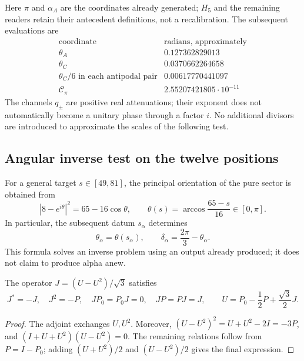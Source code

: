 Here \(\pi\) and \(\alpha_A\) are the coordinates already generated; \(H_5\) and the remaining readers retain their antecedent definitions, not a recalibration. The subsequent evaluations are
\[
\begin{array}{c|c}
 \text{coordinate}&\text{radians, approximately}\\\hline
 \theta_A&0.127362829013\\
 \theta_C&0.0370662264658\\
 \theta_C/6\text{ in each antipodal pair}&0.00617770441097\\
 \mathcal C_\pi&2.55207421805\cdot10^{-11}
\end{array}
\]
The channels \(q_\pm\) are positive real attenuations; their exponent does not automatically become a unitary phase through a factor \(i\). No additional divisors are introduced to approximate the scales of the following test.

\subsection{Angular inverse test on the twelve positions}
\label{lib02:ensayo-angular}

For a general target \(s\in[49,81]\), the principal orientation of the pure sector is obtained from
\[
 |8-e^{i\theta}|^2=65-16\cos\theta,
 \qquad \theta(s)=\arccos\frac{65-s}{16}\in[0,\pi].
\]
In particular, the subsequent datum \(s_\alpha\) determines
\[
 \theta_\alpha=\theta(s_\alpha),\qquad
 \delta_\alpha=\frac{2\pi}{3}-\theta_\alpha.
\]
This formula solves an inverse problem using an output already produced; it does not claim to produce alpha anew.

\begin{lemma}
\label{lib02:J}
The operator \(J=(U-U^2)/\sqrt3\) satisfies
\[
 J^*=-J,\quad J^2=-P,\quad JP_0=P_0J=0,\quad JP=PJ=J,
 \qquad U=P_0-\frac12P+\frac{\sqrt3}{2}J.
\]
\end{lemma}
\begin{proof}
The adjoint exchanges \(U,U^2\). Moreover, \((U-U^2)^2=U+U^2-2I=-3P\), and \((I+U+U^2)(U-U^2)=0\). The remaining relations follow from \(P=I-P_0\); adding \((U+U^2)/2\) and \((U-U^2)/2\) gives the final expression.
\end{proof}

